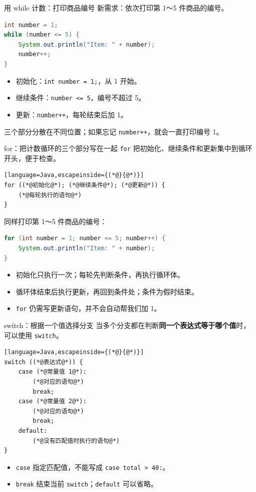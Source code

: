 \documentclass[aspectratio=169]{beamer}
\begin{document}
\begin{frame}[fragile]{用 while 计数：打印商品编号}
  新需求：依次打印第 1～5 件商品的编号。
  \begin{lstlisting}[language=Java]
int number = 1;
while (number <= 5) {
    System.out.println("Item: " + number);
    number++;
}
  \end{lstlisting}
  \begin{itemize}
    \item 初始化：\texttt{int number = 1;}，从 1 开始。
    \item 继续条件：\texttt{number <= 5}，编号不超过 5。
    \item 更新：\texttt{number++}，每轮结束后加 1。
  \end{itemize}
  \medskip
  三个部分分散在不同位置；如果忘记 \texttt{number++}，就会一直打印编号 1。
\end{frame}

\begin{frame}[fragile]{for：把计数循环的三个部分写在一起}
  \texttt{for} 把初始化、继续条件和更新集中到循环开头，便于检查。
  \begin{lstlisting}[language=Java,escapeinside={(*@}{@*)}]
for ((*@初始化@*); (*@继续条件@*); (*@更新@*)) {
    (*@每轮执行的语句@*)
}
  \end{lstlisting}
  同样打印第 1～5 件商品的编号：
  \begin{lstlisting}[language=Java]
for (int number = 1; number <= 5; number++) {
    System.out.println("Item: " + number);
}
  \end{lstlisting}
  \begin{itemize}
    \item 初始化只执行一次；每轮先判断条件，再执行循环体。
    \item 循环体结束后执行更新，再回到条件处；条件为假时结束。
    \item \texttt{for} 仍需写更新语句，并不会自动帮我们加 1。
  \end{itemize}
\end{frame}

\begin{frame}[fragile]{switch：根据一个值选择分支}
  当多个分支都在判断\textbf{同一个表达式等于哪个值}时，可以使用 \texttt{switch}。
  \begin{lstlisting}[language=Java,escapeinside={(*@}{@*)}]
switch ((*@表达式@*)) {
    case (*@常量值 1@*):
        (*@对应的语句@*)
        break;
    case (*@常量值 2@*):
        (*@对应的语句@*)
        break;
    default:
        (*@没有匹配值时执行的语句@*)
}
  \end{lstlisting}
  \begin{itemize}
    \item \texttt{case} 指定匹配值，不能写成 \texttt{case total > 40:}。
    \item \texttt{break} 结束当前 \texttt{switch}；\texttt{default} 可以省略。
  \end{itemize}
\end{frame}
\end{document}
